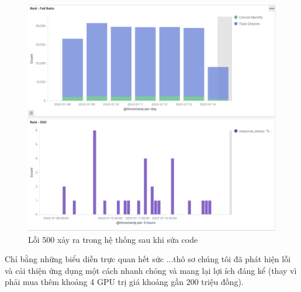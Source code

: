 \begin{figure}[H] %
    \centering %
    \includegraphics[width=1\textwidth]{figures/total_checkin_and_500.png} 
    \caption{Lỗi 500 xảy ra trong hệ thống sau khi sửa code} %
    \label{fig:elk_01}
\end{figure}

Chỉ bằng những biểu diễn trực quan hết sức ...thô sơ chúng tôi đã phát hiện lỗi và cải thiện ứng dụng một cách nhanh chóng và mang lại lợi ích đáng kể (thay vì phải mua thêm khoảng 4 GPU trị giá khoảng gần 200 triệu đồng). 

